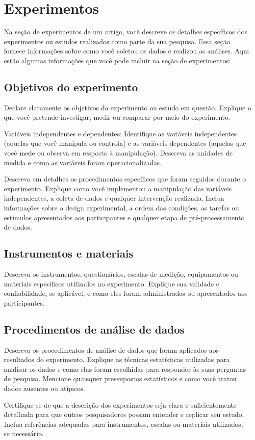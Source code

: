 \section{Experimentos}\label{:experiments}

Na seção de experimentos de um artigo, você descreve os detalhes específicos dos experimentos ou estudos realizados como parte da sua pesquisa. Essa seção fornece informações sobre como você coletou os dados e realizou as análises. Aqui estão algumas informações que você pode incluir na seção de experimentos:

\subsection{Objetivos do experimento}
Declare claramente os objetivos do experimento ou estudo em questão. Explique o que você pretende investigar, medir ou comparar por meio do experimento.

Variáveis independentes e dependentes: Identifique as variáveis independentes (aquelas que você manipula ou controla) e as variáveis dependentes (aquelas que você mede ou observa em resposta à manipulação). Descreva as unidades de medida e como as variáveis foram operacionalizadas.

Descreva em detalhes os procedimentos específicos que foram seguidos durante o experimento. Explique como você implementou a manipulação das variáveis independentes, a coleta de dados e qualquer intervenção realizada. Inclua informações sobre o design experimental, a ordem das condições, as tarefas ou estímulos apresentados aos participantes e qualquer etapa de pré-processamento de dados.

\subsection{Instrumentos e materiais}
Descreva os instrumentos, questionários, escalas de medição, equipamentos ou materiais específicos utilizados no experimento. Explique sua validade e confiabilidade, se aplicável, e como eles foram administrados ou apresentados aos participantes.

\subsection{Procedimentos de análise de dados}
Descreva os procedimentos de análise de dados que foram aplicados aos resultados do experimento. Explique as técnicas estatísticas utilizadas para analisar os dados e como elas foram escolhidas para responder às suas perguntas de pesquisa. Mencione quaisquer pressupostos estatísticos e como você tratou dados ausentes ou atípicos.

Certifique-se de que a descrição dos experimentos seja clara e suficientemente detalhada para que outros pesquisadores possam entender e replicar seu estudo. Inclua referências adequadas para instrumentos, escalas ou materiais utilizados, se necessário.